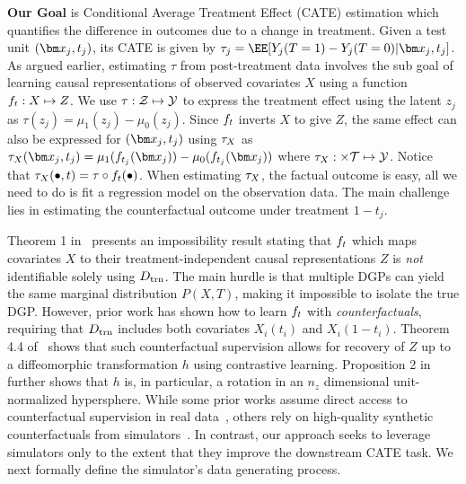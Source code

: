 \textbf{Our Goal} is Conditional Average Treatment Effect (CATE) estimation which quantifies the difference in outcomes due to a change in treatment. Given a test unit $(\xb_j, t_j)$, its CATE is given by $\tau_j = \EE[Y_j(T=1) - Y_j(T=0) | \xb_j, t_j]$. As argued earlier, estimating $\tau$ from post-treatment data involves the sub goal of learning causal representations of observed covariates $X$ using a function $f_t: X \mapsto Z$. We use $\tau : \mathcal{Z} \mapsto \mathcal{Y}$ to express the treatment effect using the latent $z_j$ as $\tau(z_j) = \mu_1(z_j) - \mu_0(z_j)$. Since $f_t$ inverts $X$ to give $Z$, the same effect can also be expressed for $(\xb_j, t_j)$ using $\tau_X$ as $\ITEx(\xb_j, t_j) = \mu_1(\RInv_{t_j}(\xb_j)) - \mu_0(\RInv_{t_j}(\xb_j))$ where $\tau_X:  \times \mathcal{T} \mapsto \mathcal{Y}$. Notice that $\tau_X(\bullet, t) = \tau \circ f_t(\bullet)$.
When estimating $\tau_X$, the factual outcome is easy, all we need to do is fit a regression model on the observation data.  The main challenge lies in estimating the counterfactual outcome under treatment $1-t_j$.

Theorem 1 in~\citep{locatello2019challenging} presents an impossibility result stating that $f_t$ which maps covariates $X$ to their treatment-independent causal representations $Z$ is {\em not} identifiable solely using $D_{\text{trn}}$. The main hurdle is that multiple DGPs can yield the same marginal distribution $P(X, T)$, making it impossible to isolate the true DGP. However, prior work has shown how to learn $f_t$ with \textit{counterfactuals}, requiring that $D_{\text{trn}}$ includes both covariates $X_i(t_i)$ and $X_i(1 - t_i)$. Theorem 4.4 of~\citep{von2021self} shows that such counterfactual supervision allows for recovery of $Z$ up to a diffeomorphic transformation $h$ using contrastive learning. Proposition 2 in~\citep{zimmermann2021cl} further shows that $h$ is, in particular, a rotation in an $n_z$ dimensional unit-normalized hypersphere. While some prior works assume direct access to counterfactual supervision in real data~\citep{nagalapatti2022learning, contrast_3}, others rely on high-quality synthetic counterfactuals from simulators~\citep{Simglucose2018, self_driving_cars}. In contrast, our approach seeks to leverage simulators only to the extent that they improve the downstream CATE task. We next formally define the simulator's data generating process.

